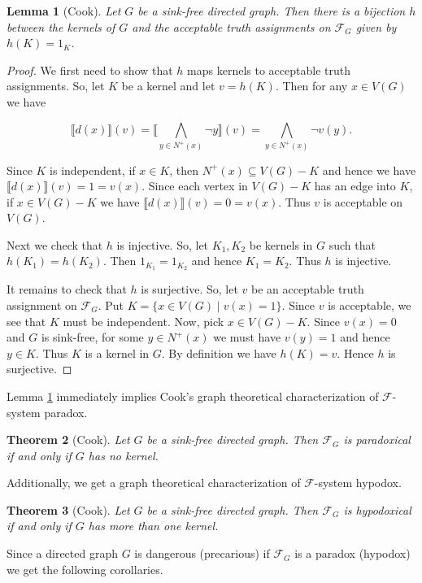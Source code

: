 \documentclass[12pt]{kluwer}
\newtheorem{thm}{Theorem}
\newtheorem{lem}[thm]{Lemma}
\theoremstyle{remark}
\newcommand{\fancy}[1]{\mathcal{#1}}
\def\F{\fancy{F}}
\def\F{\fancy{F}}
\begin{document}
\begin{lem}[Cook]\label{KernelBijection}
Let $G$ be a sink-free directed graph.  Then there is a bijection $h$ between the kernels of $G$ and the acceptable truth assignments on $\F_G$ given by $h(K) = 1_K$.
\end{lem}
\begin{proof}
We first need to show that $h$ maps kernels to acceptable truth assignments.  So, let $K$ be a kernel and let $v = h(K)$.  Then for any $x \in V(G)$ we have

\[\llbracket d(x) \rrbracket(v) = \llbracket \bigwedge_{y \in N^+(x)} \neg y \rrbracket(v) = \bigwedge_{y \in N^+(x)} \neg v(y).\]

Since $K$ is independent, if $x \in K$, then $N^+(x) \subseteq V(G) - K$ and hence we have $\llbracket d(x) \rrbracket(v) = 1 = v(x)$.  Since each vertex in $V(G) - K$ has an edge into $K$, if $x \in V(G) - K$ we have $\llbracket d(x) \rrbracket(v) = 0 = v(x)$.  Thus $v$ is acceptable on $V(G)$.

Next we check that $h$ is injective.  So, let $K_1, K_2$ be kernels in $G$ such that $h(K_1) = h(K_2)$.  Then $1_{K_1} = 1_{K_2}$ and hence $K_1 = K_2$.  Thus $h$ is injective.

It remains to check that $h$ is surjective.  So, let $v$ be an acceptable truth assignment on $\F_G$.  Put $K = \{x \in V(G) \mid v(x) = 1\}$.  Since $v$ is acceptable, we see that $K$ must be independent.  Now, pick $x \in V(G) - K$.  Since $v(x) = 0$ and $G$ is sink-free, for some $y \in N^+(x)$ we must have $v(y) = 1$ and hence $y \in K$.  Thus $K$ is a kernel in $G$.  By definition we have $h(K) = v$.  Hence $h$ is surjective.
\end{proof}

Lemma \ref{KernelBijection} immediately implies Cook's graph theoretical characterization of $\F$-system paradox.
\begin{thm}[Cook]
Let $G$ be a sink-free directed graph. Then $\F_G$ is paradoxical if and only if $G$ has no kernel.
\end{thm}

Additionally, we get a graph theoretical characterization of $\F$-system hypodox.
\begin{thm}[Cook]
Let $G$ be a sink-free directed graph. Then $\F_G$ is hypodoxical if and only if $G$ has more than one kernel.
\end{thm}

Since a directed graph $G$ is dangerous (precarious) if $\F_G$ is a paradox (hypodox) we get the following corollaries.
\end{document}
